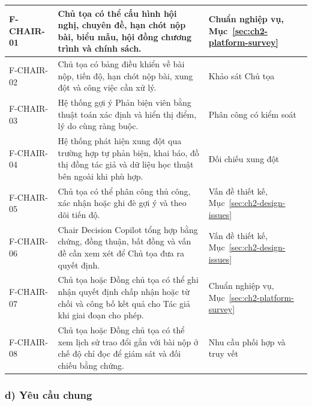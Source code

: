 \begin{longtable}{|>{\raggedright\arraybackslash}p{}|>{\raggedright\arraybackslash}p{}|>{\raggedright\arraybackslash}p{}|}
F-CHAIR-01 & Chủ tọa có thể cấu hình hội nghị, chuyên đề, hạn chót nộp bài, biểu mẫu, hội đồng chương trình và chính sách. & Chuẩn nghiệp vụ, Mục~\ref{sec:ch2-platform-survey} \\ \hline
F-CHAIR-02 & Chủ tọa có bảng điều khiển về bài nộp, tiến độ, hạn chót nộp bài, xung đột và công việc cần xử lý. & Khảo sát Chủ tọa \\ \hline
F-CHAIR-03 & Hệ thống gợi ý Phản biện viên bằng thuật toán xác định và hiển thị điểm, lý do cùng ràng buộc. & Phân công có kiểm soát \cite{ch2ref11} \\ \hline
F-CHAIR-04 & Hệ thống phát hiện xung đột qua trường hợp tự phản biện, khai báo, đồ thị đồng tác giả và dữ liệu học thuật bên ngoài khi phù hợp. & Đối chiếu xung đột \cite{ch2ref12,ch2ref13} \\ \hline
F-CHAIR-05 & Chủ tọa có thể phân công thủ công, xác nhận hoặc ghi đè gợi ý và theo dõi tiến độ. & Vấn đề thiết kế, Mục~\ref{sec:ch2-design-issues} \\ \hline
F-CHAIR-06 & Chair Decision Copilot tổng hợp bằng chứng, đồng thuận, bất đồng và vấn đề cần xem xét để Chủ tọa đưa ra quyết định. & Vấn đề thiết kế, Mục~\ref{sec:ch2-design-issues} \\ \hline
F-CHAIR-07 & Chủ tọa hoặc Đồng chủ tọa có thể ghi nhận quyết định chấp nhận hoặc từ chối và công bố kết quả cho Tác giả khi giai đoạn cho phép. & Chuẩn nghiệp vụ, Mục~\ref{sec:ch2-platform-survey} \\ \hline
F-CHAIR-08 & Chủ tọa hoặc Đồng chủ tọa có thể xem lịch sử trao đổi gắn với bài nộp ở chế độ chỉ đọc để giám sát và đối chiếu bằng chứng. & Nhu cầu phối hợp và truy vết \\
\end{longtable}
\endgroup

\subsubsection{d) Yêu cầu chung}

\begingroup
\setlength{\tabcolsep}{4pt}
\renewcommand{\arraystretch}{1.3}

